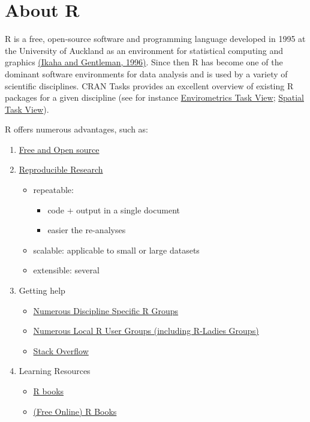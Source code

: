 \documentclass[
]{book}
\providecommand{\tightlist}{%
  \setlength{\itemsep}{0pt}\setlength{\parskip}{0pt}}
\begin{document}
\hypertarget{about-r}{%
\chapter{About R}\label{about-r}}

R is a free, open-source software and programming language developed in 1995 at the University of Auckland as an environment for statistical computing and graphics \href{https://www.stat.auckland.ac.nz/~ihaka/downloads/R-paper.pdf}{(Ikaha and Gentleman, 1996)}. Since then R has become one of the dominant software environments for data analysis and is used by a variety of scientific disciplines. CRAN Tasks provides an excellent overview of existing R packages for a given discipline (see for instance \href{https://cran.r-project.org/web/views/Environmetrics.html}{Envirometrics Task View}; \href{https://cran.r-project.org/web/views/Spatial.html}{Spatial Task View}).

R offers numerous advantages, such as:

\begin{enumerate}
\def\labelenumi{\arabic{enumi}.}
\item
  \href{https://www.gnu.org/philosophy/free-sw.html}{Free and Open source}
\item
  \href{http://christophergandrud.github.io/RepResR-RStudio/}{Reproducible Research}

  \begin{itemize}
  \tightlist
  \item
    repeatable:

    \begin{itemize}
    \tightlist
    \item
      code + output in a single document
    \item
      easier the re-analyses
    \end{itemize}
  \item
    scalable: applicable to small or large datasets
  \item
    extensible: several
  \end{itemize}
\item
  Getting help

  \begin{itemize}
  \tightlist
  \item
    \href{https://cran.r-project.org/web/views/}{Numerous Discipline Specific R Groups}
  \item
    \href{https://jumpingrivers.github.io/meetingsR/r-user-groups.html\#north-america}{Numerous Local R User Groups (including R-Ladies Groups)}
  \item
    \href{https://stackoverflow.com/}{Stack Overflow}
  \end{itemize}
\item
  Learning Resources

  \begin{itemize}
  \tightlist
  \item
    \href{https://www.r-project.org/doc/bib/R-books.html}{R books}
  \item
    \href{https://bookdown.org/}{(Free Online) R Books}
  \end{itemize}
\end{enumerate}

  
\end{document}
